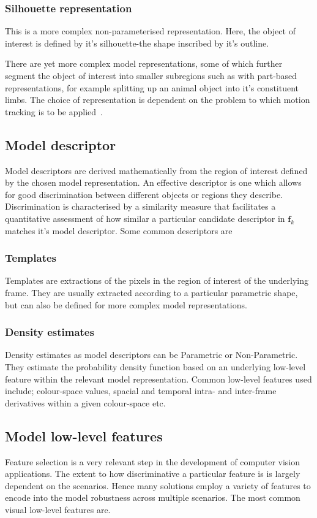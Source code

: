 \subsubsection{Silhouette representation}
This is a more complex non-parameterised representation. Here, the object of
interest is defined by it's silhouette-the shape inscribed by it's outline.

There are yet more complex model representations, some of which further segment
the object of interest into smaller subregions such as with part-based
representations, for example splitting up an animal object into it's constituent
limbs. The choice of representation is dependent on the problem to which motion
tracking is to be applied~\cite{Porikli2012}.

\subsection{Model descriptor}
Model descriptors are derived mathematically from the region of interest defined
by the chosen model representation. An effective descriptor is one which allows
for good discrimination between different objects or regions they
describe. Discrimination is characterised by a similarity measure that
facilitates a quantitative assessment of how similar a particular candidate
descriptor in $\mathbf{f}_{k}$ matches it's model descriptor.
Some common descriptors are

\subsubsection{Templates}
Templates are extractions of the pixels in the region of interest of the
underlying frame. They are usually extracted according to a particular
parametric shape, but can also be defined for more complex model representations.

\subsubsection{Density estimates}
Density estimates as model descriptors can be Parametric or Non-Parametric. They
estimate the probability density function based on an underlying low-level
feature within the relevant model representation.
Common low-level features used include; colour-space values, spacial and
temporal intra- and inter-frame derivatives within a given colour-space etc.

\subsection{Model low-level features}
Feature selection is a very relevant step in the development of computer vision
applications. The extent to how discriminative a particular feature is is
largely dependent on the scenarios. Hence many solutions employ a
variety of features to encode into the model robustness across multiple
scenarios. The most common visual low-level features are.

